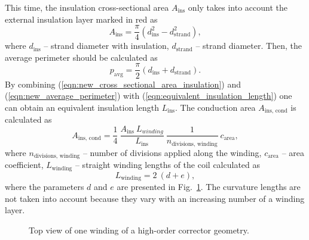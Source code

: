This time, the insulation cross-sectional area $A_\text{ins}$ only takes into account the external insulation layer marked in red as
\begin{equation}
    A_\text{ins} = \frac{\pi}{4} \left( d^2_\text{ins} - d^2_\text{strand} \right),
    \label{eqn:new_cross_sectional_area_insulation}
\end{equation}
where $d_\text{ins}$ -- strand diameter with insulation, $d_\text{strand}$ -- strand diameter. Then, the average perimeter should be calculated as
\begin{equation}
    p_\text{avg} =  \frac{\pi}{2} \left( d_\text{ins} + d_\text{strand} \right).
    \label{eqn:new_average_perimeter}
\end{equation}
By combining (\ref{eqn:new_cross_sectional_area_insulation}) and (\ref{eqn:new_average_perimeter}) with (\ref{eqn:equivalent_insulation_length}) one can obtain an equivalent insulation length $L_\text{ins}$. The conduction area $A_\text{ins, cond}$ is calculated as 
\begin{equation}
    A_\text{ins, cond} = \frac{1}{4}~\frac{ A_\text{ins} ~ L_{winding}}{L_\text{ins}}~\frac{1}{n_\text{divisions, winding}}~c_\text{area},
    \label{eqn:new_equivalent_insulation_element_area}
\end{equation}
where $n_\text{divisions, winding}$ -- number of divisions applied along the winding, $c_\text{area}$ -- area coefficient, $L_\text{winding}$ -- straight winding lengths of the coil calculated as
\begin{equation}
    L_\text{winding} = 2~(d+e),
\end{equation}
where the parameters $d$ and $e$ are presented in Fig.~\ref{fig: winding_length_in_skew_quad}. The curvature lengths are not taken into account because they vary with an increasing number of a winding layer.

\begin{figure}[H]
    \centering
    \caption{Top view of one winding of a high-order corrector geometry.}
    \label{fig: winding_length_in_skew_quad}
\end{figure}

